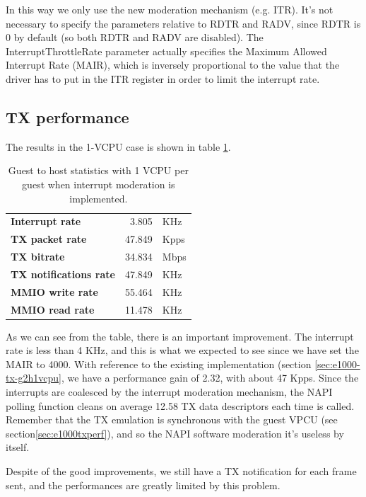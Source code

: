 In this way we only use the new moderation mechanism (e.g. ITR). It's not necessary to specify the parameters relative to RDTR and
RADV, since RDTR is 0 by default (so both RDTR and RADV are disabled). The InterruptThrottleRate parameter actually specifies the Maximum
Allowed Interrupt Rate (MAIR), which is inversely proportional to the value that the driver has to put in the ITR register in order to limit
the interrupt rate.

\subsection{TX performance}
\label{sec:e1000-mit-tx}
The results in the 1-VCPU case is shown in table \ref{tab:e1000-mit-tx-g2h1vcpu}.

\begin{table}
\begin{center}
\begin{tabular}{lrl}
\toprule
\textbf{Interrupt rate} & 3.805 & KHz\\
\textbf{TX packet rate} & 47.849 & Kpps\\
\textbf{TX bitrate} & 34.834 & Mbps\\
\textbf{TX notifications rate} & 47.849 & KHz\\
\textbf{MMIO write rate} & 55.464 & KHz\\
\textbf{MMIO read rate} & 11.478 & KHz\\
\bottomrule
\end{tabular}
\end{center}
\caption{Guest to host statistics with 1 VCPU per guest when interrupt moderation is implemented.}
\label{tab:e1000-mit-tx-g2h1vcpu}
\end{table}

As we can see from the table, there is an important improvement. The interrupt rate is less than 4 KHz, and this is what we expected to see
since we have set the MAIR to 4000.
With reference to the existing implementation (section \ref{sec:e1000-tx-g2h1vcpu}, we have a performance gain of 2.32, with about 47 Kpps.
Since the interrupts are coalesced by the interrupt moderation mechanism, the NAPI polling function cleans on average 12.58 TX data 
descriptors each time is called. Remember that the TX emulation is synchronous with the guest VPCU (see section\ref{sec:e1000txperf}), and
so the NAPI software moderation it's useless by itself.

Despite of the good improvements, we still have a TX notification for each frame sent, and the performances are greatly limited by this
problem.

